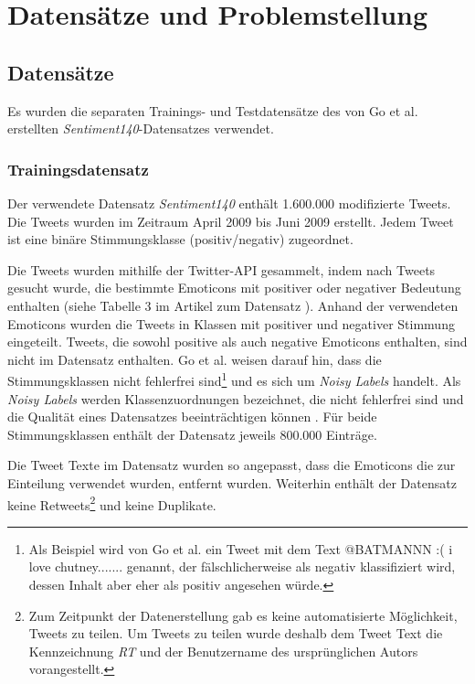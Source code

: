 \section{Datensätze und Problemstellung}\label{sec:datensätzeundproblemstellung}

\subsection{Datensätze}

Es wurden die separaten Trainings- und Testdatensätze des von Go et al. \cite{go2009twitter} erstellten \textit{Sentiment140}-Datensatzes verwendet.

\subsubsection{Trainingsdatensatz}\label{subsec:trainingsdatensatz}
Der verwendete Datensatz \textit{Sentiment140} enthält 1.600.000 modifizierte Tweets.
Die Tweets wurden im Zeitraum April 2009 bis Juni 2009 erstellt.
Jedem Tweet ist eine binäre Stimmungsklasse (positiv/negativ) zugeordnet.

Die Tweets wurden mithilfe der Twitter-API gesammelt, indem nach Tweets gesucht wurde, die bestimmte Emoticons mit positiver oder negativer Bedeutung enthalten (siehe Tabelle 3 im Artikel zum Datensatz \cite[S. 4]{go2009twitter}).
Anhand der verwendeten Emoticons wurden die Tweets in Klassen mit positiver und negativer Stimmung eingeteilt.
Tweets, die sowohl positive als auch negative Emoticons enthalten, sind nicht im Datensatz enthalten.
Go et al. \cite{go2009twitter} weisen darauf hin, dass die Stimmungsklassen nicht fehlerfrei sind\footnote{
    Als Beispiel wird von Go et al. \cite{go2009twitter} ein Tweet mit dem Text \glqq @BATMANNN :( i love chutney.......\grqq{} genannt, der fälschlicherweise als negativ klassifiziert wird, dessen Inhalt aber eher als positiv angesehen würde.
} und es sich um \textit{Noisy Labels} handelt.
Als \textit{Noisy Labels} werden Klassenzuordnungen bezeichnet, die nicht fehlerfrei sind und die Qualität eines Datensatzes beeinträchtigen können \cite{song2022learning}.
Für beide Stimmungsklassen enthält der Datensatz jeweils 800.000 Einträge.

Die Tweet Texte im Datensatz wurden so angepasst, dass die Emoticons die zur Einteilung verwendet wurden, entfernt wurden.
Weiterhin enthält der Datensatz keine Retweets\footnote{
    Zum Zeitpunkt der Datenerstellung gab es keine automatisierte Möglichkeit, Tweets zu teilen.
    Um Tweets zu teilen wurde deshalb dem Tweet Text die Kennzeichnung \textit{RT} und der Benutzername des ursprünglichen Autors vorangestellt.
} und keine Duplikate.

